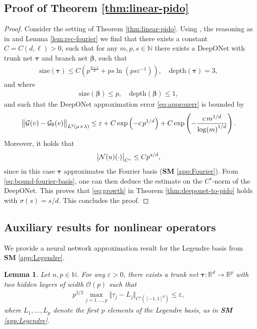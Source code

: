 \documentclass{article}
\numberwithin{equation}{section}
\newcommand{\size}{\mathrm{size}}
\newcommand{\depth}{\mathrm{depth}}
\newcommand{\R}{\mathbb{R}}
\newcommand{\N}{\mathbb{N}}
\newcommand{\cG}{\mathcal{G}}
\renewcommand{\tr}{{{\tau}}}
\newcommand{\trunk}{{\bm{\tau}}}
\newcommand{\branch}{{\bm{\beta}}}
\renewcommand{\epsilon}{\varepsilon}
\newcommand{\1}{\mathbbm{1}}
\newcommand{\bigO}{\mathcal{O}}
\newtheorem{lemma}[theorem]{Lemma}
\begin{document}
\subsection{Proof of Theorem \ref{thm:linear-pido}}\label{app:linear-pido}
\begin{proof}
Consider the setting of Theorem \ref{thm:linear-pido}. Using \cite[Theorem D.3]{LMK1}, the reasoning as in \cite[Example D.4]{LMK1} and Lemma \ref{lem:rec-fourier} we find that there exists a constant $C = C(d,\ell)>0$, such that for any $m, p, s \in \N$ there exists a DeepONet with trunk net $\trunk$ and branch net $\branch$, such that 
\begin{gather}
\size(\trunk) \le C(p^{\frac{d+1}{d}}+ps\ln(ps\epsilon^{-1})),
\quad
\depth(\trunk) = 3,
\end{gather}
and where 
\begin{gather}
\size(\branch) \le p, 
\quad
\depth(\branch) \le 1,
\end{gather}
and such that the DeepONet approximation error \eqref{eq:approxerr} is bounded by 
\begin{equation}
\norm{\cG(v)-\cG_\theta(v)}_{L^2(\mu\times\lambda)}
\le \epsilon + 
C\exp\left(-c\, p^{1/d}\right) + 
C \exp\left(-\frac{c\,m^{1/d}}{\log(m)^{1/d}}\right). 
\end{equation}
Moreover, it holds that
\begin{equation}
     \abs{\mathcal{N}(u)(\cdot)}_{C^s} \leq C p^{s/d}, 
\end{equation}
since in this case $\trunk$ approximates the Fourier basis (\textbf{SM} \ref{app:Fourier}). From \eqref{eq:bound-fourier-basis}, one can then deduce the estimate on the $C^s$-norm of the DeepONet. This proves that \eqref{eq:growth} in Theorem \ref{thm:deeponet-to-pido} holds with $\sigma(s)=s/d$. This concludes the proof. 
\end{proof}

\subsection{Auxiliary results for nonlinear operators}
We provide a neural network approximation result for the Legendre basis from \textbf{SM} \ref{app:Legendre}.

\begin{lemma}\label{lem:rec-legendre}
Let $n, p\in \N$. For any $\epsilon>0$, there exists a trunk net $\trunk: \R^d \to \R^p$ with two hidden layers of width $\bigO(p)$ such that 
\begin{align} \label{eq:Legendre-NN}
p^{3/2} \max_{j=1,\dots, p} \Vert \tr_j - L_j \Vert_{C^s([-1,1]^d)}
\le \epsilon,
\end{align}
where $L_1,\dots, L_p$ denote the first $p$ elements of the Legendre basis, as in \textbf{SM} \ref{app:Legendre}. 
\end{lemma}
\end{document}
